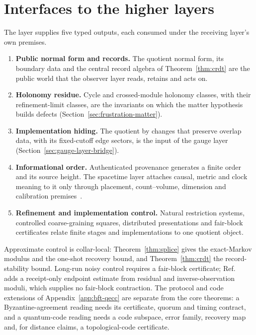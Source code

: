 \documentclass[11pt]{article}
\theoremstyle{remark}
\theoremstyle{plain}
\begin{document}
\section{Interfaces to the higher layers}
\label{sec:interfaces}

The layer supplies five typed outputs, each consumed under the receiving
layer's own premises.
\begin{enumerate}[leftmargin=2em]
\item \textbf{Public normal form and records.} The quotient normal form,
its boundary data and the central record algebra of Theorem~\ref{thm:crdt}
are the public world that the observer layer reads, retains and acts on.
\item \textbf{Holonomy residue.} Cycle and crossed-module holonomy classes,
with their refinement-limit classes, are the invariants on which the matter
hypothesis builds defects (Section~\ref{sec:frustration-matter}).
\item \textbf{Implementation hiding.} The quotient by changes that preserve
overlap data, with its fixed-cutoff edge sectors, is the input of the gauge
layer (Section~\ref{sec:gauge-layer-bridge}).
\item \textbf{Informational order.} Authenticated provenance generates a
finite order and its source height. The spacetime layer attaches causal,
metric and clock meaning to it only through placement, count--volume,
dimension and calibration premises~\cite{ophEinstein}.
\item \textbf{Refinement and implementation control.} Natural restriction
systems, controlled coarse-graining squares, distributed presentations and
fair-block certificates relate finite stages and implementations to one
quotient object.
\end{enumerate}

Approximate control is collar-local: Theorem~\ref{thm:splice} gives the
exact-Markov modulus and the one-shot recovery bound, and
Theorem~\ref{thm:crdt} the record-stability bound. Long-run noisy control
requires a fair-block certificate; Ref.~\cite{observableNormalForms} adds a
receipt-only endpoint estimate from residual and inverse-observation moduli,
which supplies no fair-block contraction. The protocol and code extensions
of Appendix~\ref{app:bft-qecc} are separate from the core theorems: a
Byzantine-agreement reading needs its certificate, quorum and timing
contract, and a quantum-code reading needs a code subspace, error family,
recovery map and, for distance claims, a topological-code certificate.
\end{document}
